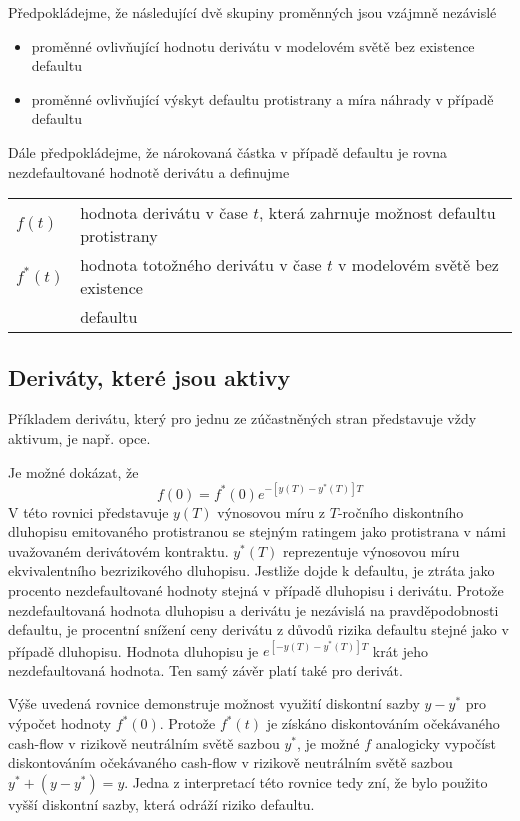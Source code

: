 \documentclass[a4paper]{book}
\begin{document}
Předpokládejme, že následující dvě skupiny proměnných jsou vzájmně nezávislé
\begin{itemize}
\item proměnné ovlivňující hodnotu derivátu v modelovém světě bez existence defaultu
\item proměnné ovlivňující výskyt defaultu protistrany a míra náhrady v případě defaultu
\end{itemize}
Dále předpokládejme, že nárokovaná částka v případě defaultu je rovna nezdefaultované hodnotě derivátu a definujme
\begin{center}
\begin{tabular}{l l}
$f(t)$		& hodnota derivátu v čase $t$, která zahrnuje možnost defaultu protistrany \\
$f^*(t)$	& hodnota totožného derivátu v čase $t$ v modelovém světě bez existence\\
		& defaultu\\
\end{tabular}
\end{center}

\subsection{Deriváty, které jsou aktivy}
Příkladem derivátu, který pro jednu ze zúčastněných stran představuje vždy aktivum, je např. opce.

Je možné dokázat, že
\begin{equation*}
f(0) = f^*(0)e^{-[y(T)-y^*(T)]T}
\end{equation*}
V této rovnici představuje $y(T)$ výnosovou míru z $T$-ročního diskontního dluhopisu emitovaného protistranou se stejným ratingem jako protistrana v námi uvažovaném derivátovém kontraktu. $y^*(T)$ reprezentuje výnosovou míru ekvivalentního bezrizikového dluhopisu. Jestliže dojde k defaultu, je ztráta jako procento nezdefaultované hodnoty stejná v případě dluhopisu i derivátu. Protože nezdefaultovaná hodnota dluhopisu a derivátu je nezávislá na pravděpodobnosti defaultu, je procentní snížení ceny derivátu z důvodů rizika defaultu stejné jako v případě dluhopisu. Hodnota dluhopisu je $e^{[-y(T)-y^*(T)]T}$ krát jeho nezdefaultovaná hodnota. Ten samý závěr platí také pro derivát.

Výše uvedená rovnice demonstruje možnost využití diskontní sazby $y-y^*$ pro výpočet hodnoty $f^*(0)$. Protože $f^*(t)$ je získáno diskontováním očekávaného cash-flow v rizikově neutrálním světě sazbou $y^*$, je možné $f$ analogicky vypočíst diskontováním očekávaného cash-flow v rizikově neutrálním světě sazbou $y^* + (y - y^*) = y$. Jedna z interpretací této rovnice tedy zní, že bylo použito vyšší diskontní sazby, která odráží riziko defaultu.
\end{document}
